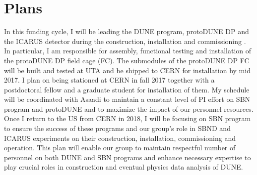 
\section*{\textbf{Plans}}
In this funding cycle, I will be leading the DUNE program, protoDUNE DP and the ICARUS detector during the construction, installation and commissioning . In particular, I am responsible for assembly, functional testing and installation of the protoDUNE DP field cage (FC).  The submodules of the protoDUNE DP FC will be built and tested at UTA and be shipped to CERN for installation by mid 2017.  I plan on being stationed at CERN in fall 2017 together with a postdoctoral fellow and a graduate student for installation of them.  My schedule will be coordinated with Asaadi to maintain a constant level of PI effort on SBN program and protoDUNE and to maximize the impact of our personnel resources.  Once I return to the US from CERN in 2018, I will be focusing on SBN program to ensure the success of these programs and our group's role in SBND and ICARUS experiments on their construction, installation, commissioning and operation.  This plan will enable our group to maintain respectful number of personnel on both DUNE and SBN programs and enhance necessary expertise to play crucial roles in construction and eventual physics data analysis of DUNE.

